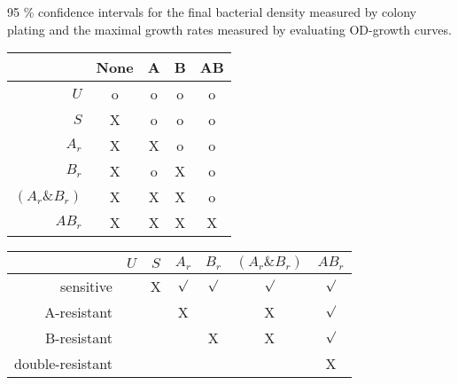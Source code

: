 \begin{table}[H]
    \centering
    \caption{95 \% confidence intervals for the final bacterial density measured by colony plating and the maximal growth rates measured by evaluating OD-growth curves.}
    \label{tab:growth_and_density}
    
\end{table}

\begin{table}[H]
    \centering
    \begin{minipage}[t]{0.5\textwidth}
        \centering
        \begin{tabular}{r|cccc}
            \toprule
                 & None & A & B & AB  \\ 
             \midrule
             $U$   & o & o & o & o \\
             $S$   & X &o&o&o\\
             $A_r$   & X & X &o&o\\
             $B_r$   & X &o& X &o\\
             $(A_r\&B_r)$   & X & X & X &o\\
             $AB_r$   & X & X & X & X \\
             \bottomrule
        \end{tabular}
        \label{tab:phenotyping}
    \end{minipage}
\end{table}

\begin{table}[H]
    \centering
    \begin{minipage}[t]{0.55\textwidth}
        \centering
        \begin{tabular}{r|cccccc}
            \toprule
                 & $U$ & $S$ & $A_r$ & $B_r$ & $(A_r\&B_r)$ & $AB_r$ \\ 
             \midrule
             sensitive     &  & X &  $\surd$ &   $\surd$ &  $\surd$ &  $\surd$ \\
             A-resistant   & &  & X  &   & X  &  $\surd$ \\
             B-resistant   & & & & X  & X  &  $\surd$  \\
             double-resistant  & &  &  & & & X  \\
             \bottomrule
        \end{tabular}
        \label{tab:bacterial-phenotypes}
    \end{minipage}
\end{table}


